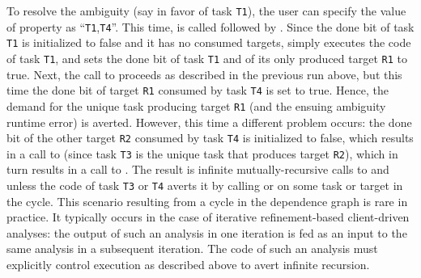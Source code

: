 To resolve the ambiguity (say in favor of task {\tt T1}), the user can
specify the value of property  as ``{\tt T1},{\tt T4}''.  This
time,  is called followed by .
Since the done bit of task {\tt T1} is initialized to false and it has no consumed
targets,  simply executes the code of task {\tt T1}, and sets
the done bit of task {\tt T1} and of its only produced target {\tt R1} to true.
Next, the call to  proceeds as described in the previous run
above, but this time the done bit of target {\tt R1} consumed by task {\tt T4} is
set to true.  Hence, the demand for the unique task producing target {\tt R1} (and
the ensuing ambiguity runtime error) is averted.  However, this time a different
problem occurs: the done bit of the other target {\tt R2} consumed by task {\tt T4} is
initialized to false, which results in a call to 
(since task {\tt T3} is the unique task that produces target {\tt R2}), which in turn
results in a call to .  The result is infinite 
mutually-recursive calls to  and  unless the
code of task {\tt T3} or {\tt T4} averts it by
calling  or  on some task or target
in the cycle.
This scenario resulting from a cycle in the dependence graph is rare in practice.
It typically occurs in the case of iterative refinement-based client-driven analyses:
the output of such an analysis in one iteration is fed as an input to the same analysis
in a subsequent iteration.  The code of such an analysis must explicitly
control execution as described above to avert infinite recursion.

